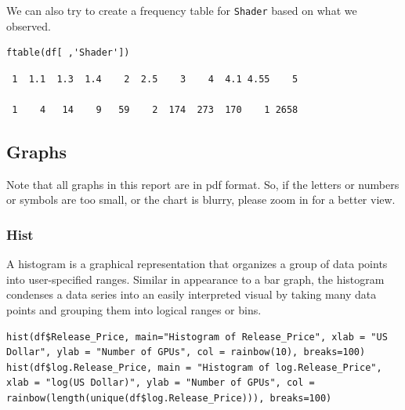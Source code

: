 \documentclass[a4paper]{article}
\begin{document}
We can also try to create a frequency table for \verb|Shader| based on what we observed.
\begin{mdframed}[leftline=false,rightline=false,backgroundcolor=lightblue!10,nobreak=false]
    \begin{verbatim}
ftable(df[ ,'Shader'])
    \end{verbatim}
\end{mdframed}
\begin{lstlisting}
 1  1.1  1.3  1.4    2  2.5    3    4  4.1 4.55    5
                                                       
 1    4   14    9   59    2  174  273  170    1 2658
\end{lstlisting}

\subsection{Graphs}
Note that all graphs in this report are in pdf format. So, if the letters or numbers or symbols are too small, or the chart is blurry, please zoom in for a better view.
\subsubsection{Hist}
A histogram is a graphical representation that organizes a group of data points into user-specified ranges. Similar in appearance to a bar graph, the histogram condenses a data series into an easily interpreted visual by taking many data points and grouping them into logical ranges or bins.
\begin{mdframed}[leftline=false,rightline=false,backgroundcolor=lightblue!10,nobreak=false]
    \begin{verbatim}
hist(df$Release_Price, main="Histogram of Release_Price", xlab = "US Dollar", ylab = "Number of GPUs", col = rainbow(10), breaks=100)
hist(df$log.Release_Price, main = "Histogram of log.Release_Price", xlab = "log(US Dollar)", ylab = "Number of GPUs", col = rainbow(length(unique(df$log.Release_Price))), breaks=100)
    \end{verbatim}
\end{mdframed}
\end{document}

